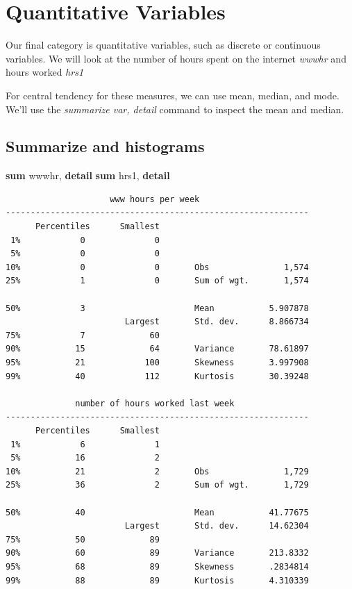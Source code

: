 \documentclass[
]{book}
\newenvironment{Shaded}{\begin{snugshade}}{\end{snugshade}}
\newcommand{\KeywordTok}[1]{\textcolor[rgb]{0.13,0.29,0.53}{\textbf{#1}}}
\newcommand{\NormalTok}[1]{#1}
\begin{document}
\section{Quantitative Variables}\label{quantitative-variables}

Our final category is quantitative variables, such as discrete or continuous variables. We will look at the number of hours spent on the internet \emph{wwwhr} and hours worked \emph{hrs1}

For central tendency for these measures, we can use mean, median, and mode. We'll use the \emph{summarize var, detail} command to inspect the mean and median.

\subsection{Summarize and histograms}\label{summarize-and-histograms}

\begin{Shaded}
\begin{Highlighting}[]
\KeywordTok{sum}\NormalTok{ wwwhr, }\KeywordTok{detail}
\KeywordTok{sum}\NormalTok{ hrs1, }\KeywordTok{detail}
\end{Highlighting}
\end{Shaded}

\begin{verbatim}
                     www hours per week
-------------------------------------------------------------
      Percentiles      Smallest
 1%            0              0
 5%            0              0
10%            0              0       Obs               1,574
25%            1              0       Sum of wgt.       1,574

50%            3                      Mean           5.907878
                        Largest       Std. dev.      8.866734
75%            7             60
90%           15             64       Variance       78.61897
95%           21            100       Skewness       3.997908
99%           40            112       Kurtosis       30.39248

              number of hours worked last week
-------------------------------------------------------------
      Percentiles      Smallest
 1%            6              1
 5%           16              2
10%           21              2       Obs               1,729
25%           36              2       Sum of wgt.       1,729

50%           40                      Mean           41.77675
                        Largest       Std. dev.      14.62304
75%           50             89
90%           60             89       Variance       213.8332
95%           68             89       Skewness       .2834814
99%           88             89       Kurtosis       4.310339
\end{verbatim}
\end{document}
